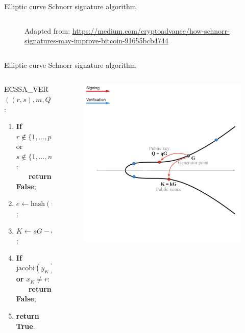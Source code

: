 \documentclass[slidescentered]{beamer}
\newcommand{\source}[1]{\caption*{\tiny Adapted from: {#1}} }
\begin{document}
\begin{frame}{Elliptic curve Schnorr signature algorithm}
\begin{columns}
\begin{column}{0.5\linewidth}
\begin{figure}
{						\source{\tiny \url{https://medium.com/cryptoadvance/how-schnorr-signatures-may-improve-bitcoin-91655bcb4744}}}
				\end{figure}
			\end{column}
		\end{columns}
	\end{frame}

	\begin{frame}{Elliptic curve Schnorr signature algorithm}
		\begin{columns}
			\begin{column}{0.6\linewidth}
				ECSSA\_VER$((r, s), m, Q)$:
				\begin{enumerate}
					\item<2 -> \textbf{If} $r \notin \{1, ..., p - 1\}$ or $s \notin \{1, ..., n - 1\}$: \\ \textbf{\ \ \ return False};
					\item<3 -> $e \gets \text{hash}(r || Q || m) \ (\text{mod} \ n)$;
					\item<4 -> $K \gets sG - eQ$;
					\item<6 -> \textbf{If} $\text{jacobi}(y_K) \neq 1$ \textbf{or} $x_K \neq r$: \\ \textbf{\ \ \ return False};
					\item<7 -> \textbf{return True}.
				\end{enumerate}
			\end{column}
			\begin{column}{0.5\linewidth}
				\begin{figure}
					 {\vspace*{-0.7cm}
						\hspace*{-0.9cm}
						\includegraphics[scale=0.28]{images/Schnorr3}
}
\end{figure}
\end{column}
\end{columns}
\end{frame}
\end{document}
